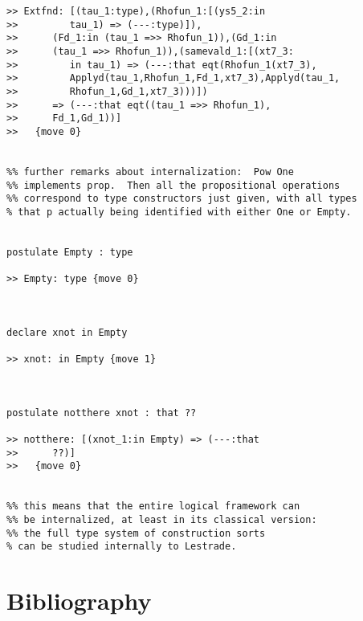 \documentclass[12pt]{article}
\begin{document}
\begin{verbatim}
>> Extfnd: [(tau_1:type),(Rhofun_1:[(ys5_2:in
>>         tau_1) => (---:type)]),
>>      (Fd_1:in (tau_1 =>> Rhofun_1)),(Gd_1:in
>>      (tau_1 =>> Rhofun_1)),(samevald_1:[(xt7_3:
>>         in tau_1) => (---:that eqt(Rhofun_1(xt7_3),
>>         Applyd(tau_1,Rhofun_1,Fd_1,xt7_3),Applyd(tau_1,
>>         Rhofun_1,Gd_1,xt7_3)))])
>>      => (---:that eqt((tau_1 =>> Rhofun_1),
>>      Fd_1,Gd_1))]
>>   {move 0}


%% further remarks about internalization:  Pow One
%% implements prop.  Then all the propositional operations
%% correspond to type constructors just given, with all types
% that p actually being identified with either One or Empty.


postulate Empty : type

>> Empty: type {move 0}



declare xnot in Empty

>> xnot: in Empty {move 1}



postulate notthere xnot : that ??

>> notthere: [(xnot_1:in Empty) => (---:that
>>      ??)]
>>   {move 0}


%% this means that the entire logical framework can 
%% be internalized, at least in its classical version:
%% the full type system of construction sorts
% can be studied internally to Lestrade.

\end{verbatim}

\newpage







\section{Bibliography}
\end{document}
